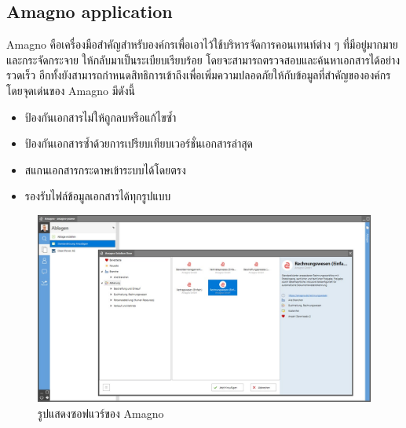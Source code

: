 \documentclass[12pt,oneside,openright,a4paper]{cpe-thai-project}
\begin{document}
\subsection{Amagno application}
\hspace*{1cm} Amagno \cite{WhatIsAmagno} คือเครื่องมือสำคัญสำหรับองค์กรเพื่อเอาไว้ใช้บริหารจัดการคอนเทนท์ต่าง ๆ ที่มีอยู่มากมายและกระจัดกระจาย ให้กลับมาเป็นระเบียบเรียบร้อย โดยจะสามารถตรวจสอบและค้นหาเอกสารได้อย่างรวดเร็ว อีกทั้งยังสามารถกำหนดสิทธิการเข้าถึงเพื่อเพิ่มความปลอดภัยให้กับข้อมูลที่สำคัญขององค์กร \\
\hspace*{1cm} โดยจุดเด่นของ Amagno มีดังนี้
\begin{itemize}
  \item ป้องกันเอกสารไม่ให้ถูกลบหรือแก้ไขซ้ำ
  \item ป้องกันเอกสารซ้ำด้วยการเปรียบเทียบเวอร์ชั่นเอกสารล่าสุด
  \item สแกนเอกสารกระดาษเข้าระบบได้โดยตรง
  \item รองรับไฟล์ข้อมูลเอกสารได้ทุกรูปแบบ
\end{itemize}
\begin{figure}[!h]\centering
  \includegraphics[width=13cm]{./assets/amagno.png}
  \caption{รูปแสดงซอฟแวร์ของ Amagno}\label{fig:amagno}
\end{figure}

\clearpage
\end{document}

